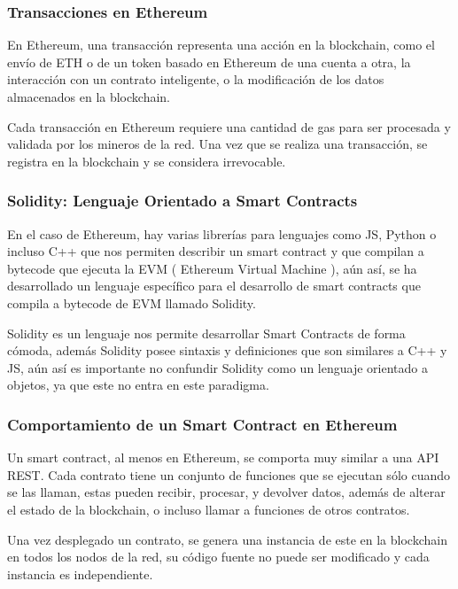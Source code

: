 \subsubsection{Transacciones en Ethereum}

En Ethereum, una transacción representa una acción en la blockchain, como el envío de ETH o de un token basado en Ethereum de una cuenta a otra, la interacción con un contrato inteligente, o la modificación de los datos almacenados en la blockchain.

\bigskip

Cada transacción en Ethereum requiere una cantidad de gas para ser procesada y validada por los mineros de la red. Una vez que se realiza una transacción, se registra en la blockchain y se considera irrevocable.

\subsubsection{Solidity: Lenguaje Orientado a Smart Contracts}

En el caso de Ethereum, hay varias librerías para lenguajes como JS, Python o incluso C++ que nos permiten describir un smart contract y que compilan a bytecode que ejecuta la EVM ( Ethereum Virtual Machine ), aún así, se ha desarrollado un lenguaje específico para el desarrollo de smart contracts que compila a bytecode de EVM llamado Solidity.

\bigskip

Solidity\cite{soliditylang} es un lenguaje nos permite desarrollar Smart Contracts de forma cómoda, además Solidity posee sintaxis y definiciones que son similares a C++ y JS, aún así es importante no confundir Solidity como un lenguaje orientado a objetos, ya que este no entra en este paradigma.

\subsubsection{Comportamiento de un Smart Contract en Ethereum}

Un smart contract, al menos en Ethereum, se comporta muy similar a una API REST\cite{rest}. Cada contrato tiene un conjunto de funciones que se ejecutan sólo cuando se las llaman, estas pueden recibir, procesar, y devolver datos, además de alterar el estado de la blockchain, o incluso llamar a funciones de otros contratos.

\bigskip

Una vez desplegado un contrato, se genera una instancia de este en la blockchain en todos los nodos de la red, su código fuente no puede ser modificado y cada instancia es independiente.

